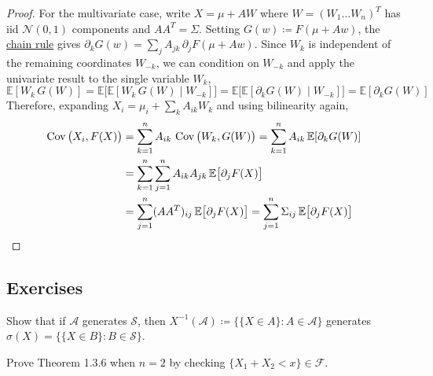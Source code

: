\begin{proof}
    For the multivariate case, write $X = \mu + A W$ where $W = (W_1 \ldots W_n)^T$ has iid $\mathcal{N}(0, 1)$ components and $A A^T = \Sigma$. Setting $G(w) \coloneqq F(\mu + A w)$, the \hyperref[mv-thm:chain-rule]{chain rule} gives $\partial_k G (w) = \sum_{j} A_{jk} \, \partial_j F (\mu + A w)$. Since $W_k$ is independent of the remaining coordinates $W_{-k}$, we can condition on $W_{-k}$ and apply the univariate result to the single variable $W_k$, 
    \begin{equation}
      \mathbb{E}[W_k \, G(W)] = \mathbb{E} \big[ \mathbb{E}[ W_k \, G(W) \mid W_{-k} ] \big] = \mathbb{E} \big[ \mathbb{E}[ \partial_k G(W) \mid W_{-k}] \big] = \mathbb{E}[\partial_k G(W)]
    \end{equation}
    Therefore, expanding $X_i = \mu_i + \sum_k A_{ik} W_k$ and using bilinearity again, 
    \begin{align*}
      \operatorname{Cov} \big( X_i, F(X) \big) & = \sum_{k=1}^n A_{ik} \, \operatorname{Cov} \big( W_k, G(W) \big) = \sum_{k=1}^n A_{ik} \, \mathbb{E}[\partial_k G(W)] \\
      & = \sum_{k=1}^n \sum_{j=1}^n A_{ik} A_{jk} \, \mathbb{E} \big[ \partial_j F(X) \big] \\
      & = \sum_{j=1}^n (A A^T)_{ij} \, \mathbb{E} \big[ \partial_j F(X) \big] = \sum_{j=1}^n \Sigma_{ij} \, \mathbb{E} \big[ \partial_j F(X) \big]
    \end{align*}
  \end{proof}

\subsection{Exercises}

  \begin{exercise}[Durrett 1.3.1]
    Show that if $\mathcal{A}$ generates $\mathcal{S}$, then $X^{-1}(\mathcal{A}) \coloneqq \{\{X \in A\} : A \in \mathcal{A}\}$ generates $\sigma(X) = \{\{X \in B\} : B \in \mathcal{S}\}$.
  \end{exercise}
  \begin{solution}

  \end{solution}

  \begin{exercise}[Durrett 1.3.2]
    Prove Theorem 1.3.6 when $n = 2$ by checking $\{X_1 + X_2 < x\} \in \mathcal{F}$.
  \end{exercise}
  \begin{solution}

  \end{solution}

